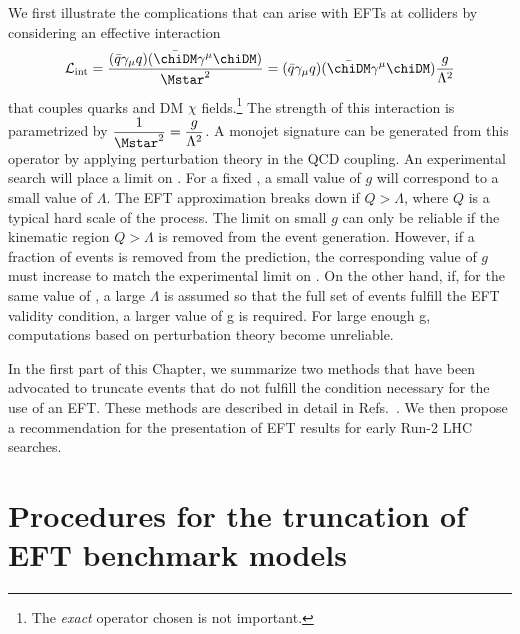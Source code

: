 We first illustrate the complications
that can arise with EFTs at colliders by considering an effective interaction
$$ {\cal L}_\textrm{int} = {(\bar q\gamma_\mu q)(\bar\chiDM\gamma^\mu\chiDM) \over \Mstar^2}
= (\bar q\gamma_\mu q)(\bar\chiDM\gamma^\mu\chiDM) {g\over \Lambda^2}$$
that couples quarks and DM $\chi$ fields.\footnote{The \textit{exact} operator chosen is not important.}   The strength of this interaction is
parametrized by $\displaystyle {1\over \Mstar^2} = {g\over \Lambda^2}$.
A monojet signature can be generated from this operator
by applying perturbation theory in the QCD coupling.
An experimental search will place a limit on \Mstar.   
For a fixed \Mstar, a small value of $g$ will correspond
to a small value of $\Lambda$.   The EFT approximation breaks down
if $Q>\Lambda$, where $Q$ is a typical hard scale of the process.
The limit on small $g$ can only be reliable if the
kinematic region $Q>\Lambda$ is removed from the event generation.
However, if a fraction of events is removed from the prediction,
the corresponding value of $g$ must increase to match the experimental
limit on \Mstar.
On the other hand, if, for the same value of \Mstar, a large $\Lambda$
is assumed so that the full set of events fulfill the EFT validity condition,
a larger value of g is required.  For large enough g, computations based on perturbation theory become unreliable.

In the first part of this Chapter, we summarize two methods that
have been advocated to truncate events that 
do not fulfill the condition necessary for the use of an EFT.
These methods are described in detail in Refs.~\cite{Busoni:2013lha,Busoni:2014sya,Busoni:2014haa,Aad:2015zva,Racco:2015dxa,Berlin:2014cfa}. 
We then propose a recommendation for the presentation of EFT results for early Run-2 LHC searches.

\section{Procedures for the truncation of EFT benchmark models}

